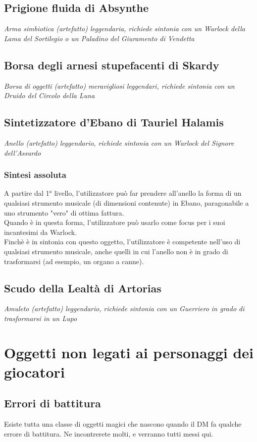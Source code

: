 \subsection{Prigione fluida di Absynthe}
\textit{Arma simbiotica (artefatto) leggendaria, richiede sintonia con un Warlock della Lama del Sortilegio o un Paladino del Giuramento di Vendetta}

\subsection{Borsa degli arnesi stupefacenti di Skardy}
\textit{Borsa di oggetti (artefatto) meravigliosi leggendari, richiede sintonia con un Druido del Circolo della Luna}

\subsection{Sintetizzatore d'Ebano di Tauriel Halamis}
\textit{Anello (artefatto) leggendario, richiede sintonia con un Warlock del Signore dell'Assurdo}

\subsubsection{Sintesi assoluta}
A partire dal 1° livello, l'utilizzatore può far prendere all'anello la forma di un qualsiasi strumento musicale (di dimensioni contenute) in Ebano, paragonabile a uno strumento "vero" di ottima fattura.\\ Quando è in questa forma, l'utilizzatore può usarlo come focus per i suoi incantesimi da Warlock.\\ Finchè è in sintonia con questo oggetto, l'utilizzatore è competente nell'uso di qualsiasi strumento musicale, anche quelli in cui l'anello non è in grado di trasformarsi (ad esempio, un organo a canne).

\subsection{Scudo della Lealtà di Artorias}
\textit{Amuleto (artefatto) leggendario, richiede sintonia con un Guerriero in grado di trasformarsi in un Lupo}

\section{Oggetti non legati ai personaggi dei giocatori}

\subsection{Errori di battitura}
Esiste tutta una classe di oggetti magici che nascono quando il DM fa qualche errore di battitura. Ne incontrerete molti, e verranno tutti messi qui.

